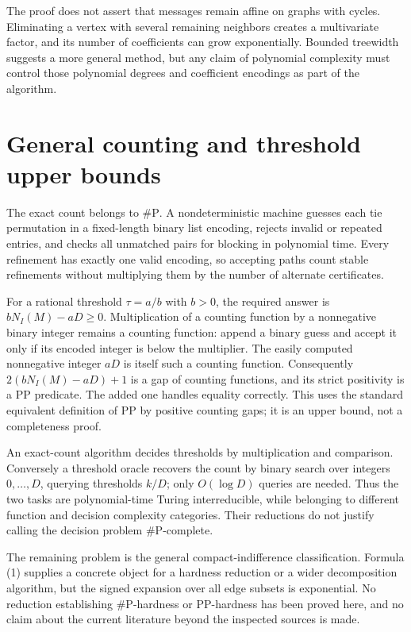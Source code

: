 \documentclass[11pt,a4paper]{article}
\begin{document}
The proof does not assert that messages remain affine on graphs with cycles. Eliminating a vertex with several remaining neighbors creates a multivariate factor, and its number of coefficients can grow exponentially. Bounded treewidth suggests a more general method, but any claim of polynomial complexity must control those polynomial degrees and coefficient encodings as part of the algorithm.

\section{General counting and threshold upper bounds}
The exact count belongs to $\#\mathrm P$. A nondeterministic machine guesses each tie permutation in a fixed-length binary list encoding, rejects invalid or repeated entries, and checks all unmatched pairs for blocking in polynomial time. Every refinement has exactly one valid encoding, so accepting paths count stable refinements without multiplying them by the number of alternate certificates.

For a rational threshold $\tau=a/b$ with $b>0$, the required answer is $bN_I(M)-aD\ge0$. Multiplication of a counting function by a nonnegative binary integer remains a counting function: append a binary guess and accept it only if its encoded integer is below the multiplier. The easily computed nonnegative integer $aD$ is itself such a counting function. Consequently $2(bN_I(M)-aD)+1$ is a gap of counting functions, and its strict positivity is a $\mathrm{PP}$ predicate. The added one handles equality correctly. This uses the standard equivalent definition of $\mathrm{PP}$ by positive counting gaps; it is an upper bound, not a completeness proof.

An exact-count algorithm decides thresholds by multiplication and comparison. Conversely a threshold oracle recovers the count by binary search over integers $0,\ldots,D$, querying thresholds $k/D$; only $O(\log D)$ queries are needed. Thus the two tasks are polynomial-time Turing interreducible, while belonging to different function and decision complexity categories. Their reductions do not justify calling the decision problem $\#\mathrm P$-complete.

The remaining problem is the general compact-indifference classification. Formula (1) supplies a concrete object for a hardness reduction or a wider decomposition algorithm, but the signed expansion over all edge subsets is exponential. No reduction establishing $\#\mathrm P$-hardness or $\mathrm{PP}$-hardness has been proved here, and no claim about the current literature beyond the inspected sources is made.
\end{document}

